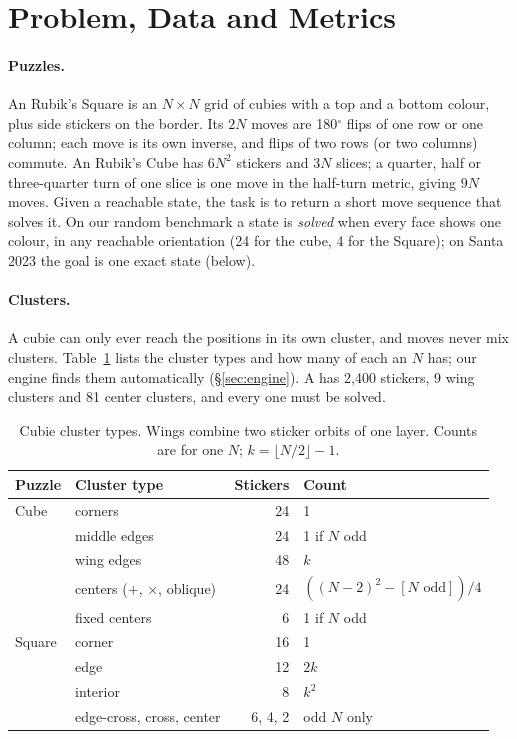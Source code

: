 \section{Problem, Data and Metrics}
\label{sec:problem}

\paragraph{Puzzles.}
An  Rubik's Square is an $N\times N$ grid of cubies with a top and a bottom colour, plus side stickers on
the border. Its $2N$ moves are 180$^\circ$ flips of one row or one column; each move is its own inverse, and
flips of two rows (or two columns) commute. An  Rubik's Cube has $6N^2$ stickers and $3N$ slices; a
quarter, half or three-quarter turn of one slice is one move in the half-turn metric, giving $9N$ moves. Given a
reachable state, the task is to return a short move sequence that solves it. On our random benchmark a state is
\emph{solved} when every face shows one colour, in any reachable orientation (24 for the cube, 4 for the Square);
on Santa 2023 the goal is one exact state (below).

\paragraph{Clusters.}
A cubie can only ever reach the positions in its own cluster, and moves never mix clusters. Table~\ref{tab:clusters}
lists the cluster types and how many of each an $N$ has; our engine finds them automatically (\S\ref{sec:engine}).
A  has 2,400 stickers, 9 wing clusters and 81 center clusters, and every one must be solved.

\begin{table}[t]
\caption{Cubie cluster types. Wings combine two sticker orbits of one layer. Counts are for one
$N$; $k=\lfloor N/2\rfloor-1$.}
\label{tab:clusters}
\small
\begin{tabular}{@{}llrl@{}}
\toprule
Puzzle & Cluster type & Stickers & Count \\
\midrule
Cube & corners & 24 & 1 \\
     & middle edges & 24 & 1 if $N$ odd \\
     & wing edges & 48 & $k$ \\
     & centers ($+$, $\times$, oblique) & 24 & $((N-2)^2-[N\text{ odd}])/4$ \\
     & fixed centers & 6 & 1 if $N$ odd \\
\midrule
Square & corner & 16 & 1 \\
       & edge & 12 & $2k$ \\
       & interior & 8 & $k^2$ \\
       & edge-cross, cross, center & 6, 4, 2 & odd $N$ only \\
\bottomrule
\end{tabular}
\end{table}

